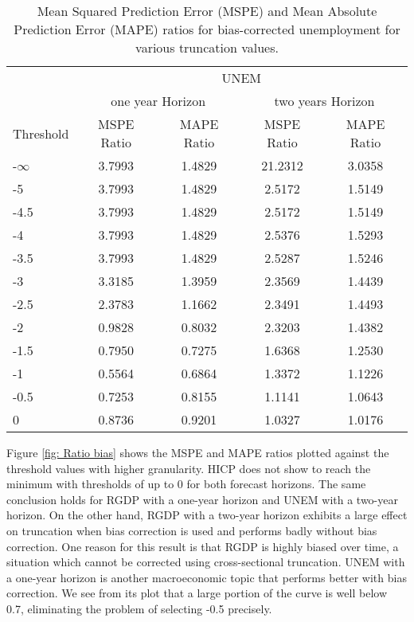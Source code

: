 \documentclass[11pt]{article}
\begin{document}
	
	\begin{table}[!h]
		\centering
		\caption{Mean Squared Prediction Error (MSPE) and Mean Absolute Prediction Error (MAPE) ratios for bias-corrected unemployment for various truncation values.}
		\label{tab: MSPE UNEM bias}
		\begin{tabular}{lcccc}
			\hline
			&                        \multicolumn{4}{c}{UNEM}                         \\
			\cmidrule(lr){2-5}                              & \multicolumn{2}{c}{one year Horizon} & \multicolumn{2}{c}{two years Horizon} \\
			\cmidrule(lr){2-3} \cmidrule(lr){4-5}
			Threshold & MSPE Ratio & MAPE Ratio  & MSPE Ratio & MAPE Ratio  \\ \hline
			-$\infty$ & 3.7993 & 1.4829 & 21.2312 & 3.0358\\ 
			-5 & 3.7993 & 1.4829 & 2.5172 & 1.5149\\ 
			-4.5 & 3.7993 & 1.4829 & 2.5172 & 1.5149\\ 
			-4 & 3.7993 & 1.4829 & 2.5376 & 1.5293\\ 
			-3.5 & 3.7993 & 1.4829 & 2.5287 & 1.5246\\ 
			-3 & 3.3185 & 1.3959 & 2.3569 & 1.4439\\ 
			-2.5 & 2.3783 & 1.1662 & 2.3491 & 1.4493\\ 
			-2 & 0.9828 & 0.8032 & 2.3203 & 1.4382\\ 
			-1.5 & 0.7950 & 0.7275 & 1.6368 & 1.2530\\ 
			-1 & 0.5564 & 0.6864 & 1.3372 & 1.1226\\ 
			-0.5 & 0.7253 & 0.8155 & 1.1141 & 1.0643\\ 
			0 & 0.8736 & 0.9201 & 1.0327 & 1.0176\\ \hline
		\end{tabular}
	\end{table}
	
	Figure \ref{fig: Ratio bias} shows the MSPE and MAPE ratios plotted against the threshold values with higher granularity. HICP does not show to reach the minimum with thresholds of up to 0 for both forecast horizons. The same conclusion holds for RGDP with a one-year horizon and UNEM with a two-year horizon. On the other hand, RGDP with a two-year horizon exhibits a large effect on truncation when bias correction is used and performs badly without bias correction. One reason for this result is that RGDP is highly biased over time,  a situation which cannot be corrected using cross-sectional truncation. UNEM with a one-year horizon is another macroeconomic topic that performs better with bias correction. We see from its plot that a large portion of the curve is well below 0.7, eliminating the problem of selecting -0.5 precisely.
	
\end{document}
